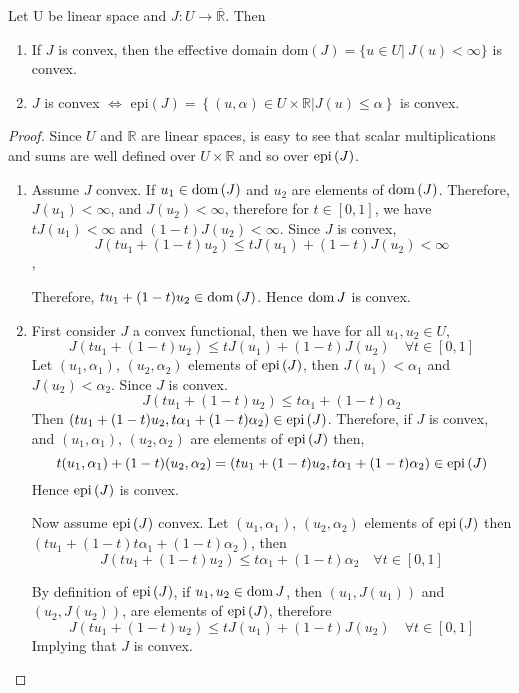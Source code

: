 \begin{lemma}
	Let U be linear space and $J: U\rightarrow \overline{\mathbb{R}}$. Then
	\begin{enumerate}
		\item If $J$ is convex, then the effective domain $\mathrm{dom}(J)=\lbrace u\in U | \ J(u) < \infty\rbrace $ is convex.
		\item $J$ is convex $\iff$ $\mathrm{epi}(J)=\left\lbrace (u,\alpha) \in U\times \mathbb{R} | J(u)\leq \alpha\right\rbrace$ is convex.
	\end{enumerate}
	\begin{proof} Since $U$ and $\mathbb{R}$ are linear spaces, is easy to see that scalar multiplications and sums are well defined over $U\times \mathbb{R}$ and so over $\mathrm{epi\,}(J)$.
		\begin{enumerate}
			\item Assume $J$ convex. If $u_1\in \mathrm{dom\,} (J)$ and $u_2$ are elements of $\mathrm{dom\,} (J)$. Therefore, $J(u_1)<\infty$, and $J(u_2)<\infty$, therefore for $t \in [0,1]$, we have $tJ(u_1)<\infty$ and $(1-t)J(u_2)<\infty$. Since $J$ is convex, 
			\[J(t u_1 + (1-t)u_2)\leq tJ(u_1)	+(1-t)J(u_2) < \infty\],
			
			Therefore, $tu_1 +(1-t)u_2 \in \mathrm{dom\,} (J)$. Hence $\mathrm{dom\,} J$ is convex.
			\item First consider $J$ a convex functional, then we have for all $u_1, u_2 \in U$,
				\[
					J(t u_1 + (1-t)u_2)\leq tJ(u_1)	+(1-t)J(u_2) \quad \forall t \in [0,1]
				\]
				Let $(u_1, \alpha_1)$, $(u_2, \alpha_2)$ elements of $\mathrm{epi\,}(J)$, then $J(u_1) < \alpha_1$ and $J(u_2)< \alpha_2$. Since $J$ is convex. 
				\[
					J(t u_1 + (1-t)u_2) \leq t \alpha_1 + (1-t)\alpha_2
				\]
				Then $(tu_1+(1-t)u_2, t \alpha_1+(1-t)\alpha_2) \in \mathrm{epi\,}(J)$. Therefore, if $J$ is convex, and $(u_1, \alpha_1)$, $(u_2, \alpha_2)$ are elements of $\mathrm{epi\,}(J)$ then,
				\[ t(u_1,\alpha_1)+(1-t)(u_2, \alpha_2)=(tu_1+(1-t)u_2, t \alpha_1+(1-t)\alpha_2) \in \mathrm{epi\,}(J) \]
				Hence $\mathrm{epi\,}(J)$ is convex. 
				
				Now assume $\mathrm{epi\,}(J)$ convex. Let $(u_1, \alpha_1)$, $(u_2, \alpha_2)$ elements of $\mathrm{epi\,}(J)$ then $(tu_1+(1-t)t \alpha_1 + (1-t)\alpha_2) $, then
				\[
							J(t u_1 + (1-t)u_2) \leq t \alpha_1 + (1-t)\alpha_2 \quad \forall t \in [0,1]
				\]
				
				By definition of $\mathrm{epi\,}(J)$, if $u_1, u_2 \in \mathrm{dom\,} J$, then $(u_1, J(u_1))$ and $(u_2, J(u_2))$, are elements of $\mathrm{epi\,}(J)$, therefore
				\[
					J(t u_1 + (1-t)u_2) \leq t J(u_1) + (1-t)J(u_2) \quad \forall t \in [0,1]
				\]
				Implying that $J$ is convex.
		\end{enumerate}
	\end{proof}
\end{lemma}

